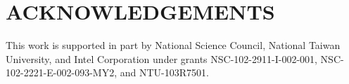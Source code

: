 \section{ACKNOWLEDGEMENTS}

This work is supported in part by National Science Council, National Taiwan University, and Intel Corporation under grants NSC-102-2911-I-002-001, NSC-102-2221-E-002-093-MY2, and NTU-103R7501.
